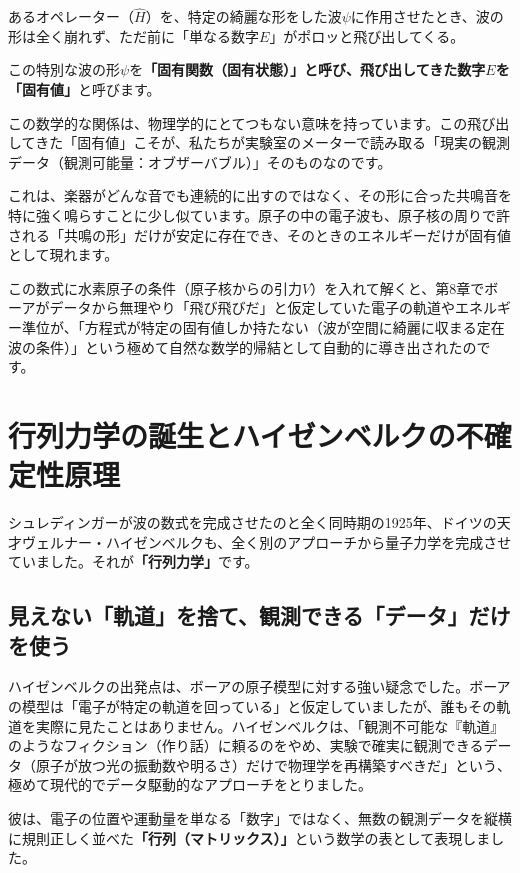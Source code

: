 あるオペレーター（\(\hat{H}\)）を、特定の綺麗な形をした波\(\psi\)に作用させたとき、波の形は全く崩れず、ただ前に「単なる数字\(E\)」がポロッと飛び出してくる。

この特別な波の形\(\psi\)を\textbf{「固有関数（固有状態）」と呼び、飛び出してきた数字\(E\)を「固有値」}と呼びます。

この数学的な関係は、物理学的にとてつもない意味を持っています。この飛び出してきた「固有値」こそが、私たちが実験室のメーターで読み取る「現実の観測データ（観測可能量：オブザーバブル）」そのものなのです。

これは、楽器がどんな音でも連続的に出すのではなく、その形に合った共鳴音を特に強く鳴らすことに少し似ています。原子の中の電子波も、原子核の周りで許される「共鳴の形」だけが安定に存在でき、そのときのエネルギーだけが固有値として現れます。

この数式に水素原子の条件（原子核からの引力\(V\)）を入れて解くと、第8章でボーアがデータから無理やり「飛び飛びだ」と仮定していた電子の軌道やエネルギー準位が、「方程式が特定の固有値しか持たない（波が空間に綺麗に収まる定在波の条件）」という極めて自然な数学的帰結として自動的に導き出されたのです。

\section{行列力学の誕生とハイゼンベルクの不確定性原理}

シュレディンガーが波の数式を完成させたのと全く同時期の1925年、ドイツの天才ヴェルナー・ハイゼンベルクも、全く別のアプローチから量子力学を完成させていました。それが\textbf{「行列力学」}です。

\subsection{見えない「軌道」を捨て、観測できる「データ」だけを使う}

ハイゼンベルクの出発点は、ボーアの原子模型に対する強い疑念でした。ボーアの模型は「電子が特定の軌道を回っている」と仮定していましたが、誰もその軌道を実際に見たことはありません。ハイゼンベルクは、「観測不可能な『軌道』のようなフィクション（作り話）に頼るのをやめ、実験で確実に観測できるデータ（原子が放つ光の振動数や明るさ）だけで物理学を再構築すべきだ」という、極めて現代的でデータ駆動的なアプローチをとりました。

彼は、電子の位置や運動量を単なる「数字」ではなく、無数の観測データを縦横に規則正しく並べた\textbf{「行列（マトリックス）」}という数学の表として表現しました。


